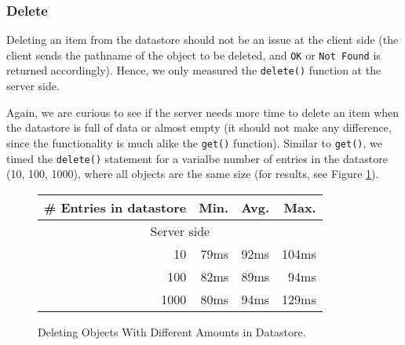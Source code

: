 \subsubsection{Delete}
Deleting an item from the datastore should not be an issue at the client side
(the client sends the pathname of the object to be deleted, and \texttt{OK} or
\texttt{Not Found} is returned accordingly). Hence, we only measured the
\texttt{delete()} function at the server side. 

Again, we are curious to see if the server needs more time to delete an item
when the datastore is full of data or almost empty (it should not make any
difference, since the functionality is much alike the \texttt{get()} function).
Similar to \texttt{get()}, we timed the \texttt{delete()} statement for a
varialbe number of entries in the datastore (10, 100, 1000), where all objects
are the same size (for results, see Figure \ref{del-obj-amt}).

\begin{figure}
\begin{tabular}{|r|r|r|r|}
\hline
\# Entries in datastore & Min. & Avg. & Max. \\
\hline
\multicolumn{4}{|c|}{Server side} \\
\hline
10 & 79ms & 92ms & 104ms  \\
100 & 82ms & 89ms & 94ms \\
1000 & 80ms & 94ms & 129ms \\
\hline
\end{tabular}
\caption{Deleting Objects With Different Amounts in Datastore.
\label{del-obj-amt}}
\end{figure}

